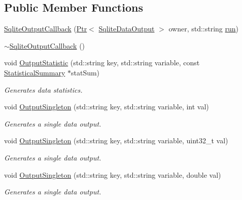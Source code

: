 \subsection*{Public Member Functions}
\begin{DoxyCompactItemize}
\item 
\hyperlink{classns3_1_1SqliteDataOutput_1_1SqliteOutputCallback_a8a208998cdd83cb8720005b1683f74fa}{Sqlite\+Output\+Callback} (\hyperlink{classns3_1_1Ptr}{Ptr}$<$ \hyperlink{classns3_1_1SqliteDataOutput}{Sqlite\+Data\+Output} $>$ owner, std\+::string \hyperlink{generate__test__data__lte__spectrum__value__txpsd_8m_a093eaf8ac95b223aafb28e4668160d1f}{run})
\item 
\hyperlink{classns3_1_1SqliteDataOutput_1_1SqliteOutputCallback_a47f4171c747a107e3b99687a6195ac26}{$\sim$\+Sqlite\+Output\+Callback} ()
\item 
void \hyperlink{classns3_1_1SqliteDataOutput_1_1SqliteOutputCallback_a0eb873c0f4d8c544979e4d51929143b2}{Output\+Statistic} (std\+::string key, std\+::string variable, const \hyperlink{classns3_1_1StatisticalSummary}{Statistical\+Summary} $\ast$stat\+Sum)
\begin{DoxyCompactList}\small\item\em Generates data statistics. \end{DoxyCompactList}\item 
void \hyperlink{classns3_1_1SqliteDataOutput_1_1SqliteOutputCallback_ae59a18de163ab8a2242f6d7ae075982b}{Output\+Singleton} (std\+::string key, std\+::string variable, int val)
\begin{DoxyCompactList}\small\item\em Generates a single data output. \end{DoxyCompactList}\item 
void \hyperlink{classns3_1_1SqliteDataOutput_1_1SqliteOutputCallback_a8f2abc805fb02d9c95c88986652e13de}{Output\+Singleton} (std\+::string key, std\+::string variable, uint32\+\_\+t val)
\begin{DoxyCompactList}\small\item\em Generates a single data output. \end{DoxyCompactList}\item 
void \hyperlink{classns3_1_1SqliteDataOutput_1_1SqliteOutputCallback_a6141ffe2ed65c115ef1296b9d74370ff}{Output\+Singleton} (std\+::string key, std\+::string variable, double val)
\begin{DoxyCompactList}\small\item\em Generates a single data output. \end{DoxyCompactList}\item 

\end{DoxyCompactItemize}
